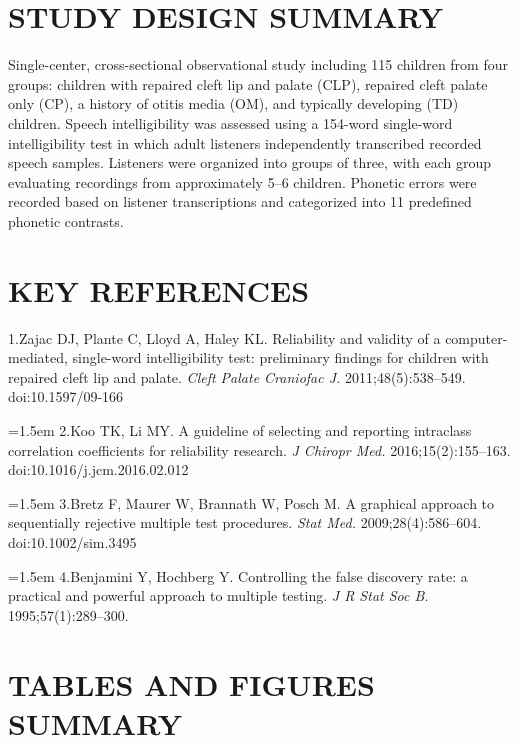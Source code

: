 \documentclass{article}
\begin{document}
\section*{STUDY DESIGN SUMMARY}\label{sec:summary}

Single-center, cross-sectional observational study including 115 children from four groups: children with repaired cleft lip and palate (CLP), repaired cleft palate only (CP), a history of otitis media (OM), and typically developing (TD) children. Speech intelligibility was assessed using a 154-word single-word intelligibility test in which adult listeners independently transcribed recorded speech samples. Listeners were organized into groups of three, with each group evaluating recordings from approximately 5–6 children. Phonetic errors were recorded based on listener transcriptions and categorized into 11 predefined phonetic contrasts.

\section*{KEY REFERENCES}\label{sec:refs}
\setlength{\parindent}{0pt}
\setlength{\hangindent}{1.5em}
1.\enspace Zajac DJ, Plante C, Lloyd A, Haley KL. Reliability and validity of a 
computer-mediated, single-word intelligibility test: preliminary findings for 
children with repaired cleft lip and palate. \textit{Cleft Palate Craniofac J.} 
2011;48(5):538--549. doi:10.1597/09-166

\hangindent=1.5em
2.\enspace Koo TK, Li MY. A guideline of selecting and reporting intraclass 
correlation coefficients for reliability research. \textit{J Chiropr Med.} 
2016;15(2):155--163. doi:10.1016/j.jcm.2016.02.012

\hangindent=1.5em
3.\enspace Bretz F, Maurer W, Brannath W, Posch M. A graphical approach to 
sequentially rejective multiple test procedures. \textit{Stat Med.} 
2009;28(4):586--604. doi:10.1002/sim.3495

\hangindent=1.5em
4.\enspace Benjamini Y, Hochberg Y. Controlling the false discovery rate: a 
practical and powerful approach to multiple testing. \textit{J R Stat Soc B.} 
1995;57(1):289--300.

\section*{TABLES AND FIGURES SUMMARY}\label{sec:tables}
\end{document}
